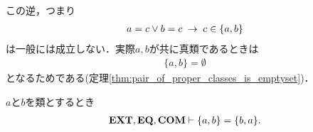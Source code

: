	この逆，つまり
	\begin{align}
		a = c \vee b = c \hspace{0.25em}\rightarrow\hspace{0.25em} c \in \{a,b\}
	\end{align}
	は一般には成立しない．実際$a,b$が共に真類であるときは
	\begin{align}
		\{a,b\} = \emptyset
	\end{align}
	となるためである(定理\ref{thm:pair_of_proper_classes_is_emptyset})．
	
	\begin{screen}
		\begin{thm}[表示の順番を入れ替えても対は等しい]
		\label{thm:commutative_law_of_pairs}
			$a$と$b$を類とするとき
			\begin{align}
				\mbox{{\bf EXT}},\mbox{{\bf EQ}},\mbox{\bf COM} \vdash \{a,b\} = \{b,a\}.
			\end{align}
		\end{thm}
	\end{screen}
	
